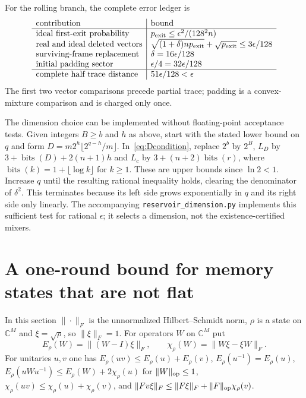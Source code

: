 \documentclass[11pt,a4paper]{article}
\theoremstyle{plain}
\theoremstyle{definition}
\theoremstyle{remark}
\begin{document}
For the rolling branch, the complete error ledger is
\[
\begin{array}{l|l}
\text{contribution}&\text{bound}\\\hline
\text{ideal first-exit probability}&p_{\rm exit}\le\epsilon^2/(128^2n)\\
\text{real and ideal deleted vectors}&\sqrt{(1+\delta)np_{\rm exit}}+\sqrt{p_{\rm exit}}\le3\epsilon/128\\
\text{surviving-frame replacement}&\delta=16\epsilon/128\\
\text{initial padding sector}&\epsilon/4=32\epsilon/128\\\hline
\text{complete half trace distance}&51\epsilon/128<\epsilon
\end{array}
\]
The first two vector comparisons precede partial trace; padding is a convex-mixture comparison and is charged only once.

The dimension choice can be implemented without floating-point acceptance tests. Given integers $B\ge b$ and $h$ as above, start with the stated lower bound on $q$ and form $D=m2^h\lfloor2^{q-h}/m\rfloor$.
In~\eqref{eq:Dcondition}, replace $2^b$ by $2^B$, $L_D$ by
$3+\operatorname{bits}(D)+2(n+1)h$ and $L_c$ by $3+(n+2)\operatorname{bits}(r)$,
where $\operatorname{bits}(k)=1+\lfloor\log k\rfloor$ for $k\ge1$.
These are upper bounds since $\ln2<1$. Increase $q$ until the resulting rational inequality holds, clearing the denominator of $\delta^2$.
This terminates because its left side grows exponentially in $q$ and its right side only linearly.
The accompanying \texttt{reservoir\_dimension.py} implements this sufficient test for rational $\epsilon$; it selects a dimension, not the existence-certified mixers.


\section{A one-round bound for memory states that are not flat}\label{sec:weighted}

In this section $\|\cdot\|_F$ is the unnormalized Hilbert--Schmidt norm, $\rho$ is a state on $\mathbb C^M$ and $\xi=\sqrt\rho$, so
$\|\xi\|_F=1$. For operators $W$ on $\mathbb C^M$ put
\[
E_\rho(W)=\|(W-I)\xi\|_F,\qquad \chi_\rho(W)=\|W\xi-\xi W\|_F .
\]
For unitaries $u,v$ one has $E_\rho(uv)\le E_\rho(u)+E_\rho(v)$, $E_\rho(u^{-1})=E_\rho(u)$, $E_\rho(uWu^{-1})\le E_\rho(W)+2\chi_\rho(u)$ for
$\|W\|_{\rm op}\le1$, $\chi_\rho(uv)\le\chi_\rho(u)+\chi_\rho(v)$, and $\|Fv\xi\|_F\le\|F\xi\|_F+\|F\|_{\rm op}\chi_\rho(v)$.
\end{document}
